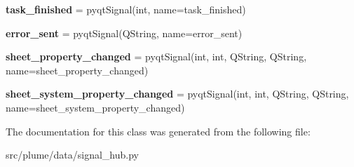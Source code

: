 \begin{DoxyCompactItemize}
\item 
{\bfseries task\+\_\+finished} = pyqt\+Signal(int, name=\textquotesingle{}task\+\_\+finished\textquotesingle{})\hypertarget{classplume-creator_1_1src_1_1plume_1_1data_1_1signal__hub_1_1_signal_hub_a4a0c2e8ce604a8b6e73477fa5863ad28}{}\label{classplume-creator_1_1src_1_1plume_1_1data_1_1signal__hub_1_1_signal_hub_a4a0c2e8ce604a8b6e73477fa5863ad28}

\item 
{\bfseries error\+\_\+sent} = pyqt\+Signal(\textquotesingle{}Q\+String\textquotesingle{}, name=\textquotesingle{}error\+\_\+sent\textquotesingle{})\hypertarget{classplume-creator_1_1src_1_1plume_1_1data_1_1signal__hub_1_1_signal_hub_a93b2484d5f89568c87aa6816a94ec344}{}\label{classplume-creator_1_1src_1_1plume_1_1data_1_1signal__hub_1_1_signal_hub_a93b2484d5f89568c87aa6816a94ec344}

\item 
{\bfseries sheet\+\_\+property\+\_\+changed} = pyqt\+Signal(int, int, \textquotesingle{}Q\+String\textquotesingle{}, \textquotesingle{}Q\+String\textquotesingle{}, name=\textquotesingle{}sheet\+\_\+property\+\_\+changed\textquotesingle{})\hypertarget{classplume-creator_1_1src_1_1plume_1_1data_1_1signal__hub_1_1_signal_hub_a6d0333eaab530c138ff516524dd3ffbe}{}\label{classplume-creator_1_1src_1_1plume_1_1data_1_1signal__hub_1_1_signal_hub_a6d0333eaab530c138ff516524dd3ffbe}

\item 
{\bfseries sheet\+\_\+system\+\_\+property\+\_\+changed} = pyqt\+Signal(int, int, \textquotesingle{}Q\+String\textquotesingle{}, \textquotesingle{}Q\+String\textquotesingle{}, name=\textquotesingle{}sheet\+\_\+system\+\_\+property\+\_\+changed\textquotesingle{})\hypertarget{classplume-creator_1_1src_1_1plume_1_1data_1_1signal__hub_1_1_signal_hub_a3e405201fa6af1341f1f6f7ec5154f35}{}\label{classplume-creator_1_1src_1_1plume_1_1data_1_1signal__hub_1_1_signal_hub_a3e405201fa6af1341f1f6f7ec5154f35}

\end{DoxyCompactItemize}


The documentation for this class was generated from the following file\+:\begin{DoxyCompactItemize}
\item 
src/plume/data/signal\+\_\+hub.\+py\end{DoxyCompactItemize}
